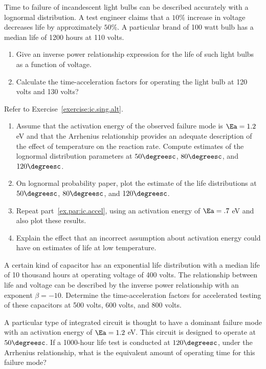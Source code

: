 \begin{exercise}
Time to failure of incandescent light bulbs can be described
accurately with a lognormal distribution. A test engineer claims
that a $10\%$ increase in voltage decreases life by approximately $50\%$.
A particular brand of 100 watt bulb has a median life of 1200 hours at
110 volts.
\begin{enumerate}
\item
Give an inverse power relationship expression for the life of such light bulbs
as a function of voltage.
\item
Calculate the time-acceleration factors for operating the light bulb at
120 volts and 130 volts?
\end{enumerate}
\end{exercise}

\begin{exercise}
Refer to Exercise~\ref{exercise:ic.sing.alt}.  
\begin{enumerate}
\item
\label{ex.par:ic.accel}
Assume that the activation energy of the observed failure mode is
$\Ea=1.2$ eV and that the Arrhenius
relationship provides an adequate description of the effect of temperature on
the reaction rate. Compute estimates of
the lognormal distribution parameters
at $50\degreesc$, $80\degreesc$, and
$120\degreesc$.
\item
On lognormal probability paper, plot the estimate of
the life distributions at $50\degreesc$, $80\degreesc$, and
$120\degreesc$.
\item
Repeat part~\ref{ex.par:ic.accel}, using an
activation energy of $\Ea=.7$ eV and also plot these results.
\item
Explain the effect that an incorrect assumption about 
activation energy could have on estimates of life at low
temperature.
\end{enumerate}
\end{exercise}

\begin{exercise}
A certain kind of capacitor has an exponential life distribution
with a median life of 10 thousand hours at operating voltage of 400
volts. The relationship between life and voltage can be described by
the inverse power relationship with an exponent
$\beta=-10$. Determine the time-acceleration factors for accelerated
testing of these capacitors at 500 volts, 600 volts, and 800 volts.
\end{exercise}

\begin{exercise}
A particular type of integrated circuit is thought to have a dominant failure
mode with an activation energy of $\Ea=1.2$ eV.  This
circuit is designed to operate at $50\degreesc$.  If a
1000-hour life test is conducted at $120\degreesc$, under the
Arrhenius relationship, what is the equivalent amount of operating time for
this failure mode?
\end{exercise}

